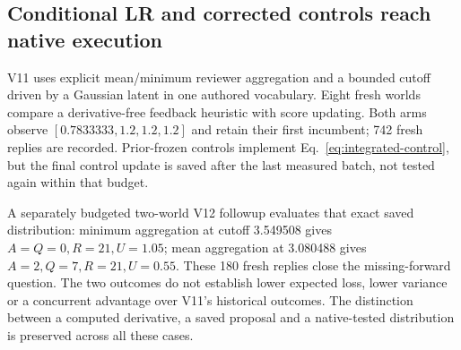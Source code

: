 \subsection{Conditional LR and corrected controls reach native execution}
V11 uses explicit mean/minimum reviewer aggregation and a bounded cutoff
driven by a Gaussian latent in one authored vocabulary. Eight fresh worlds
compare a derivative-free feedback heuristic with score updating. Both arms
observe $[0.7833333, 1.2, 1.2, 1.2]$ and retain their first incumbent; 742 fresh
replies are recorded. Prior-frozen controls implement
Eq.~\eqref{eq:integrated-control}, but the final control update is saved after
the last measured batch, not tested again within that budget.

A separately budgeted two-world V12 followup evaluates that exact saved
distribution: minimum aggregation at cutoff 3.549508 gives $A=Q=0,R=21,U=1.05$;
mean aggregation at 3.080488 gives $A=2,Q=7,R=21,U=0.55$. These 180 fresh replies
close the missing-forward question. The two outcomes do not establish lower
expected loss, lower variance or a concurrent advantage over V11's historical
outcomes. The distinction between a computed derivative, a saved proposal
and a native-tested distribution is preserved across all these cases.
\FloatBarrier
